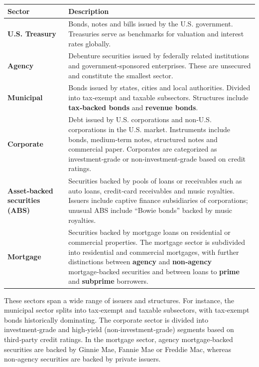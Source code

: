 \documentclass[
  letterpaper,
  DIV=11,
  numbers=noendperiod]{scrartcl}
\begin{document}
\begin{longtable}[]{@{}
  >{\raggedright\arraybackslash}p{}
  >{\raggedright\arraybackslash}p{}@{}}
\toprule\noalign{}
\begin{minipage}[b]{\linewidth}\raggedright
Sector
\end{minipage} & \begin{minipage}[b]{\linewidth}\raggedright
Description
\end{minipage} \\
\midrule\noalign{}
\endhead
\bottomrule\noalign{}
\endlastfoot
\textbf{U.S. Treasury} & Bonds, notes and bills issued by the U.S.
government. Treasuries serve as benchmarks for valuation and interest
rates globally. \\
\textbf{Agency} & Debenture securities issued by federally related
institutions and government‑sponsored enterprises. These are unsecured
and constitute the smallest sector. \\
\textbf{Municipal} & Bonds issued by states, cities and local
authorities. Divided into tax‑exempt and taxable subsectors. Structures
include \textbf{tax‑backed bonds} and \textbf{revenue bonds}. \\
\textbf{Corporate} & Debt issued by U.S. corporations and non‑U.S.
corporations in the U.S. market. Instruments include bonds, medium‑term
notes, structured notes and commercial paper. Corporates are categorized
as investment‑grade or non‑investment‑grade based on credit ratings. \\
\textbf{Asset‑backed securities (ABS)} & Securities backed by pools of
loans or receivables such as auto loans, credit‑card receivables and
music royalties. Issuers include captive finance subsidiaries of
corporations; unusual ABS include ``Bowie bonds'' backed by music
royalties. \\
\textbf{Mortgage} & Securities backed by mortgage loans on residential
or commercial properties. The mortgage sector is subdivided into
residential and commercial mortgages, with further distinctions between
\textbf{agency} and \textbf{non‑agency} mortgage‑backed securities and
between loans to \textbf{prime} and \textbf{subprime} borrowers. \\
\end{longtable}

These sectors span a wide range of issuers and structures. For instance,
the municipal sector splits into tax‑exempt and taxable subsectors, with
tax‑exempt bonds historically dominating. The corporate sector is
divided into investment‑grade and high‑yield (non‑investment‑grade)
segments based on third‑party credit ratings. In the mortgage sector,
agency mortgage‑backed securities are backed by Ginnie Mae, Fannie Mae
or Freddie Mac, whereas non‑agency securities are backed by private
issuers.
\end{document}
